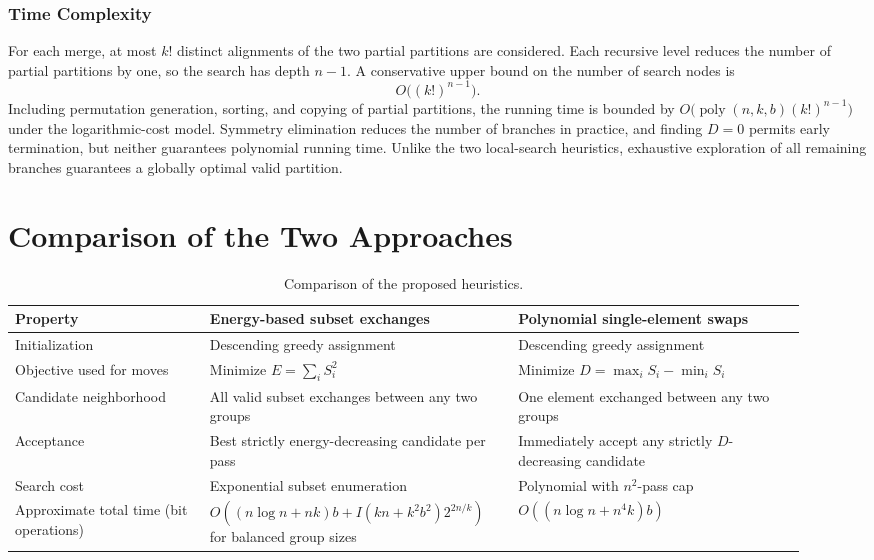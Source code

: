 \documentclass[11pt,a4paper]{article}
\begin{document}
\subsubsection{Time Complexity}
For each merge, at most $k!$ distinct alignments of the two partial partitions are considered. Each recursive level reduces the number of partial partitions by one, so the search has depth $n-1$. A conservative upper bound on the number of search nodes is
\begin{equation}
O\bigl((k!)^{n-1}\bigr).
\end{equation}
Including permutation generation, sorting, and copying of partial partitions, the running time is bounded by $O\bigl(\operatorname{poly}(n,k,b)(k!)^{n-1}\bigr)$ under the logarithmic-cost model. Symmetry elimination reduces the number of branches in practice, and finding $D=0$ permits early termination, but neither guarantees polynomial running time. Unlike the two local-search heuristics, exhaustive exploration of all remaining branches guarantees a globally optimal valid partition.

\newpage
\section{Comparison of the Two Approaches}
\begin{table}[ht]
\centering\small
\caption{Comparison of the proposed heuristics.}
\begin{tabular}{p{0.23\linewidth}p{0.35\linewidth}p{0.34\linewidth}}
\toprule
Property & Energy-based subset exchanges & Polynomial single-element swaps\\
\midrule
Initialization & Descending greedy assignment & Descending greedy assignment\\
Objective used for moves & Minimize $E=\sum_i S_i^2$ & Minimize $D=\max_iS_i-\min_iS_i$\\
Candidate neighborhood & All valid subset exchanges between any two groups & One element exchanged between any two groups\\
Acceptance & Best strictly energy-decreasing candidate per pass & Immediately accept any strictly $D$-decreasing candidate\\
Search cost & Exponential subset enumeration & Polynomial with $n^2$-pass cap\\
Approximate total time (bit operations) & $O((n\log n+nk)b+I(kn+k^2b^2)2^{2n/k})$ for balanced group sizes & $O((n\log n+n^4k)b)$\\
\bottomrule
\end{tabular}
\end{table}
\end{document}
